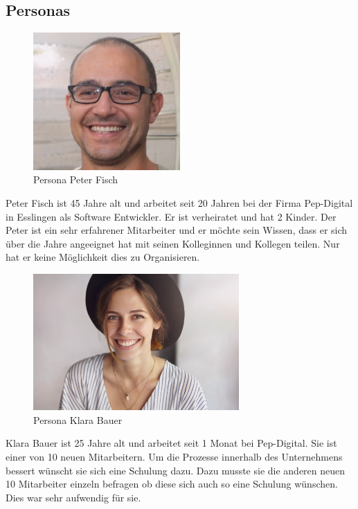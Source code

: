 \documentclass[a4paper,12pt]{article}
\begin{document}
\subsection{Personas}
\begin{figure}[h]
  \centering
  \includegraphics[width=0.5\textwidth]{Abbildungen/Persona_1.png}
  \caption{Persona Peter Fisch}
  \label{fig:persona_1}
\end{figure} 
Peter Fisch ist 45 Jahre alt und arbeitet seit 20 Jahren bei der Firma Pep-Digital in Esslingen als Software Entwickler. Er ist verheiratet und hat 2 Kinder. Der Peter ist ein sehr erfahrener Mitarbeiter und er möchte sein Wissen, dass er sich über die Jahre angeeignet hat mit seinen Kolleginnen und Kollegen teilen. Nur hat er keine Möglichkeit dies zu Organisieren.
\newpage
\begin{figure}[h]
  \centering
  \includegraphics[width=0.7\textwidth]{Abbildungen/Persona_2.png}
  \caption{Persona Klara Bauer}
  \label{fig:persona_2}
\end{figure}
Klara Bauer ist 25 Jahre alt und arbeitet seit 1 Monat bei Pep-Digital. Sie ist einer von 10 neuen Mitarbeitern. Um die Prozesse innerhalb des Unternehmens bessert wünscht sie sich eine Schulung dazu. Dazu musste sie die anderen neuen 10 Mitarbeiter einzeln befragen ob diese sich auch so eine Schulung wünschen. Dies war sehr aufwendig für sie.
\newpage
\end{document}
